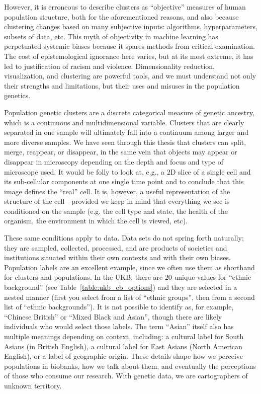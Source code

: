 However, it is erroneous to describe clusters as ``objective'' measures of human population structure, both for the aforementioned reasons, and also because clustering changes based on many subjective inputs: algorithms, hyperparameters, subsets of data, etc\citep{watson_philosophy_2023}. This myth of objectivity in machine learning has perpetuated systemic biases because it spares methods from critical examination\citep{gebru_race_2020}. The cost of epistemological ignorance here varies, but at its most extreme, it has led to justification of racism and violence\citep{panofsky_genetic_2019,panofsky_how_2021,carlson_counter_2022}. Dimensionality reduction, visualization, and clustering are powerful tools, and we must understand not only their strengths and limitations, but their uses and misuses in the population genetics. 

Population genetic clusters are a discrete categorical measure of genetic ancestry, which is a continuous and multidimensional variable. Clusters that are clearly separated in one sample will ultimately fall into a continuum among larger and more diverse samples\citep{lewis_getting_2022}. We have seen through this thesis that clusters can split, merge, reappear, or disappear, in the same vein that objects may appear or disappear in microscopy depending on the depth and focus and type of microscope used. It would be folly to look at, e.g., a $2$D slice of a single cell and its sub-cellular components at one single time point and to conclude that this image defines the ``real'' cell. It is, however, a useful representation of the structure of the cell---provided we keep in mind that everything we see is conditioned on the sample (e.g. the cell type and state, the health of the organism, the environment in which the cell is viewed, etc).

These same conditions apply to data. Data sets do not spring forth naturally; they are sampled, collected, processed, and are products of societies and institutions situated within their own contexts and with their own biases\citep{dignazio_data_2020}. Population labels are an excellent example, since we often use them as shorthand for clusters and populations. In the UKB, there are $20$ unique values for ``ethnic background'' (see Table~\ref{table:ukb_eb_options}) and they are selected in a nested manner (first you select from a list of ``ethnic groups'', then from a second list of ``ethnic backgrounds''). It is not possible to identify as, for example, ``Chinese British'' or ``Mixed Black and Asian'', though there are likely individuals who would select those labels. The term ``Asian'' itself also has multiple meanings depending on context, including: a cultural label for South Asians (in British English), a cultural label for East Asians (North American English), or a label of geographic origin. These details shape how we perceive populations in biobanks, how we talk about them, and eventually the perceptions of those who consume our research. With genetic data, we are cartographers of unknown territory.

